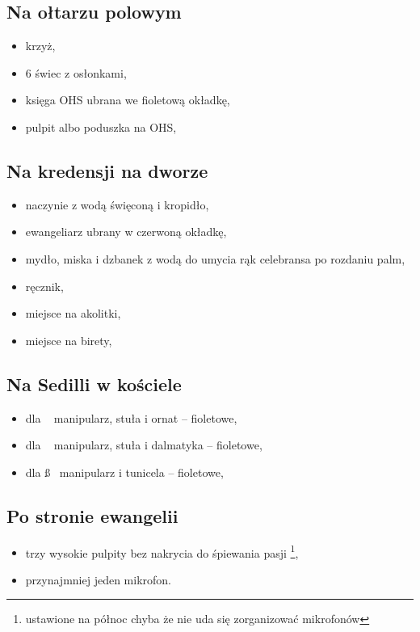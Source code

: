 \subsection{Na ołtarzu polowym}

\begin{itemize}
	\item krzyż,
	\item 6 świec z osłonkami,
	\item księga OHS ubrana we {\color{violet}fioletową} okładkę,
	\item pulpit albo poduszka na OHS,
\end{itemize}

\subsection{Na kredensji na dworze}

\begin{itemize}
	\item naczynie z wodą święconą i kropidło,
	\item ewangeliarz ubrany w {\color{red}czerwoną} okładkę,
	\item mydło, miska i dzbanek z wodą do umycia rąk celebransa po rozdaniu
	      palm,
	\item ręcznik,
	\item miejsce na akolitki,
	\item miejsce na birety,
\end{itemize}

\subsection{Na Sedilli w kościele}

\begin{itemize}
	\item dla \ii~ manipularz, stuła i ornat – {\color{violet}fioletowe},
	\item dla \dd~ manipularz, stuła i dalmatyka – {\color{violet}fioletowe},
	\item dla \ss~ manipularz i tunicela – {\color{violet}fioletowe},
\end{itemize}

\subsection{Po stronie ewangelii}

\begin{itemize}
	\item trzy wysokie pulpity bez nakrycia do śpiewania pasji
	      \footnote{ustawione na północ chyba że nie uda się zorganizować
	      mikrofonów},
	\item przynajmniej jeden mikrofon.
\end{itemize}